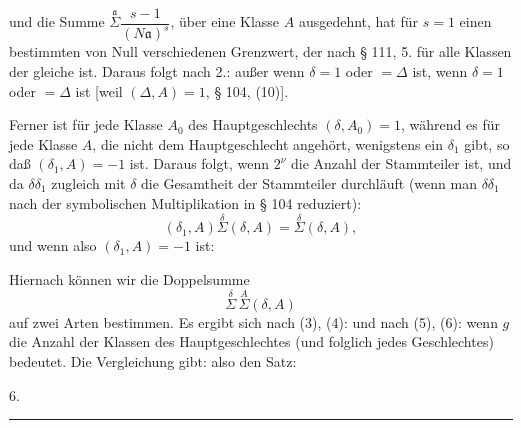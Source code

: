 und die Summe $\overset{\mathfrak a}{\Sigma}\dfrac{s-1}{(N\mathfrak a)^s}$, über eine Klasse $A$ ausgedehnt, hat für $s=1$ einen bestimmten von Null verschiedenen Grenzwert, der nach § 111, 5. für alle Klassen der gleiche ist. Daraus folgt nach 2.:
außer wenn $\delta=1$ oder $=\Delta$ ist,
wenn $\delta=1$ oder $=\Delta$ ist [weil $(\Delta,A)=1$, § 104, (10)].

Ferner ist für jede Klasse $A_0$ des Hauptgeschlechts $(\delta,A_0)=1$, während es für jede Klasse $A$, die nicht dem Hauptgeschlecht angehört, wenigstens ein $\delta_1$ gibt, so daß $(\delta_1,A)=-1$ ist. Daraus folgt, wenn $2^\nu$ die Anzahl der Stammteiler ist,
und da $\delta\delta_1$ zugleich mit $\delta$ die Gesamtheit der Stammteiler durchläuft (wenn man $\delta\delta_1$ nach der symbolischen Multiplikation in § 104 reduziert):
\[
(\delta_1,A)\overset{\delta}{\Sigma}(\delta,A) = \overset{\delta}{\Sigma}(\delta,A),
\]
und wenn also $(\delta_1,A)=-1$ ist:

Hiernach können wir die Doppelsumme
\[
\overset{\delta}{\Sigma}\,\overset{A}{\Sigma}(\delta,A)
\]
auf zwei Arten bestimmen. Es ergibt sich nach (3), (4):
und nach (5), (6):
wenn $g$ die Anzahl der Klassen des Hauptgeschlechtes (und folglich jedes Geschlechtes) bedeutet. Die Vergleichung gibt:
also den Satz:

6. 

\begin{center}\rule{0.32\linewidth}{0.4pt}\end{center}
